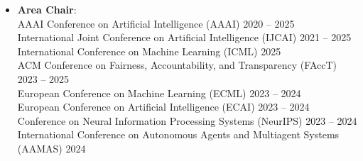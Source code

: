 \documentclass[localFont,alternative]{documentMETADATA}
\begin{document}
\begin{itemize}
    \item {\bf Area Chair}: \\
    AAAI Conference on Artificial Intelligence (AAAI) \hfill {2020 -- 2025}\\
    International Joint Conference on Artificial Intelligence (IJCAI) \hfill {2021 -- 2025}\\
    International Conference on Machine Learning (ICML) \hfill {2025}\\
    ACM Conference on Fairness, Accountability, and Transparency (FAccT) \hfill {2023 -- 2025}\\
    European Conference on Machine Learning (ECML) \hfill{2023 -- 2024}\\
  	European Conference on Artificial Intelligence (ECAI) \hfill {2023 -- 2024}\\
  	Conference on Neural Information Processing Systems (NeurIPS)
  	\hfill {2023 -- 2024} \\
    International Conference on Autonomous Agents and Multiagent Systems (AAMAS) \hfill{2024}
  \end{itemize}
\end{document}

